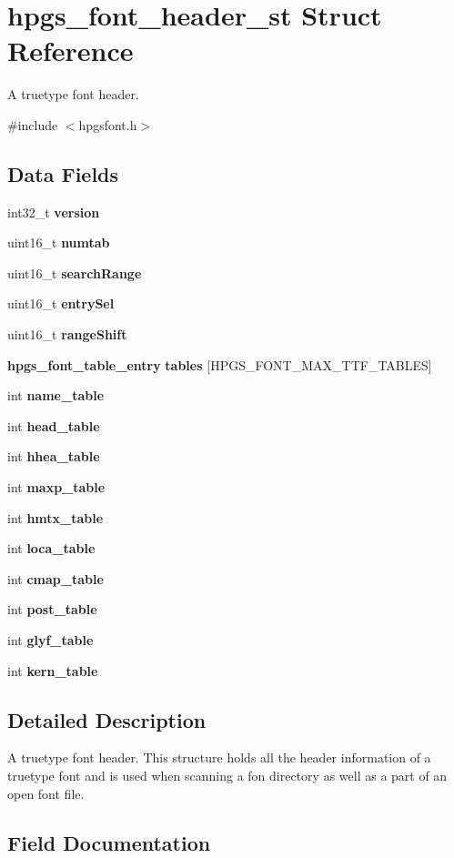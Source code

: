 \section{hpgs\_\-font\_\-header\_\-st Struct Reference}
\label{structhpgs__font__header__st}


A truetype font header.  




{\ttfamily \#include $<$hpgsfont.h$>$}

\subsection*{Data Fields}
\begin{DoxyCompactItemize}
\item 
int32\_\-t {\bf version}
\item 
uint16\_\-t {\bf numtab}
\item 
uint16\_\-t {\bf searchRange}
\item 
uint16\_\-t {\bf entrySel}
\item 
uint16\_\-t {\bf rangeShift}
\item 
{\bf hpgs\_\-font\_\-table\_\-entry} {\bf tables} [HPGS\_\-FONT\_\-MAX\_\-TTF\_\-TABLES]
\item 
int {\bf name\_\-table}
\item 
int {\bf head\_\-table}
\item 
int {\bf hhea\_\-table}
\item 
int {\bf maxp\_\-table}
\item 
int {\bf hmtx\_\-table}
\item 
int {\bf loca\_\-table}
\item 
int {\bf cmap\_\-table}
\item 
int {\bf post\_\-table}
\item 
int {\bf glyf\_\-table}
\item 
int {\bf kern\_\-table}
\end{DoxyCompactItemize}


\subsection{Detailed Description}
A truetype font header. This structure holds all the header information of a truetype font and is used when scanning a fon directory as well as a part of an open font file. 

\subsection{Field Documentation}
